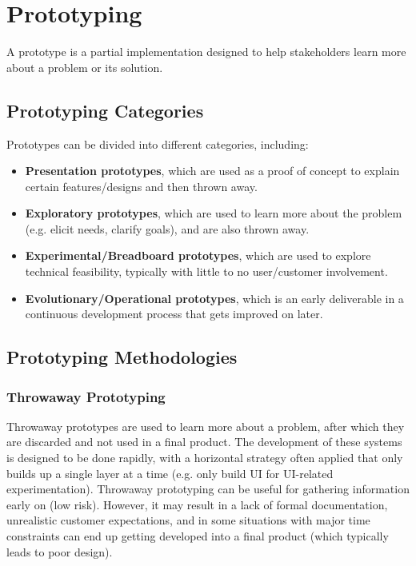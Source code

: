 \documentclass[12pt,titlepage]{article}
\begin{document}
  \section{Prototyping}
    A prototype is a partial implementation designed to help stakeholders learn more about a problem or its solution.

    \subsection{Prototyping Categories}
      Prototypes can be divided into different categories, including:
      \begin{itemize}
        \item \textbf{Presentation prototypes}, which are used as a proof of concept to explain certain features/designs and then thrown away.
        \item \textbf{Exploratory prototypes}, which are used to learn more about the problem (e.g. elicit needs, clarify goals), and are also thrown away.
        \item \textbf{Experimental/Breadboard prototypes}, which are used to explore technical feasibility, typically with little to no user/customer involvement.
        \item \textbf{Evolutionary/Operational prototypes}, which is an early deliverable in a continuous development process that gets improved on later.
      \end{itemize}

    \subsection{Prototyping Methodologies}

      \subsubsection{Throwaway Prototyping}
        Throwaway prototypes are used to learn more about a problem, after which they are discarded and not used in a final product. The development of these systems is designed to be
        done rapidly, with a horizontal strategy often applied that only builds up a single layer at a time (e.g. only build UI for UI-related experimentation). Throwaway prototyping can
        be useful for gathering information early on (low risk). However, it may result in a lack of formal documentation, unrealistic customer expectations, and in some situations with
        major time constraints can end up getting developed into a final product (which typically leads to poor design).
\end{document}
